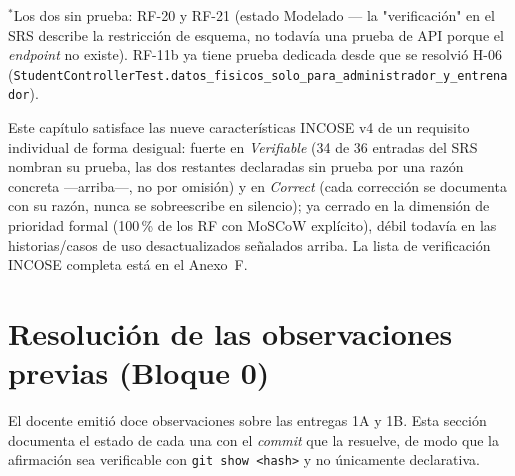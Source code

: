 \documentclass[11pt,a4paper]{article}
\begin{document}
$^\ast$Los dos sin prueba: RF-20 y RF-21 (estado Modelado — la
"verificación" en el SRS describe la restricción de esquema, no todavía
una prueba de API porque el \emph{endpoint} no existe). RF-11b ya tiene
prueba dedicada desde que se resolvió H-06
(\texttt{StudentControllerTest.datos\_fisicos\_solo\_para\_administrador\_y\_entrenador}).

Este capítulo satisface las nueve características INCOSE v4 de un
requisito individual de forma desigual: fuerte en \emph{Verifiable} (34
de 36 entradas del SRS nombran su prueba, las dos restantes declaradas
sin prueba por una razón concreta —arriba—, no por omisión) y en
\emph{Correct} (cada corrección se documenta con su razón, nunca se
sobreescribe en silencio); ya cerrado en la dimensión de prioridad
formal (100\,\% de los RF con MoSCoW explícito), débil todavía en las
historias/casos de uso desactualizados señalados arriba. La lista de
verificación INCOSE completa está en el Anexo~F.

\section{Resolución de las observaciones previas (Bloque 0)}
\label{sec:observaciones}

El docente emitió doce observaciones sobre las entregas 1A y 1B. Esta sección
documenta el estado de cada una con el \emph{commit} que la resuelve, de modo
que la afirmación sea verificable con \texttt{git show <hash>} y no
únicamente declarativa.
\end{document}
